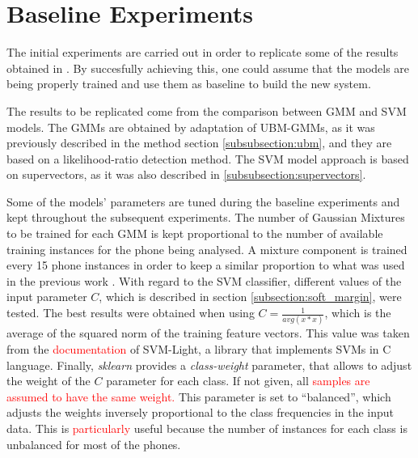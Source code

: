 
\section{Baseline Experiments}

The initial experiments are carried out in order to replicate some of
the results obtained in \cite{main}.
By succesfully achieving this, one could assume that the models are being properly trained
and use them as baseline to build the new system.

The results to be replicated come from the comparison between GMM and SVM models.
The GMMs are obtained by adaptation of UBM-GMMs, as it was previously described in
the method section \ref{subsubsection:ubm}, and they are based on
a likelihood-ratio detection method.
The SVM model approach is based on supervectors, as it was also described
in \ref{subsubsection:supervectors}.

Some of the models' parameters are tuned during the baseline experiments
and kept throughout the subsequent experiments.
The number of Gaussian Mixtures to be trained for each GMM
is kept proportional to the number of
available training instances for the phone being analysed. A
mixture component is trained every 15 phone instances
in order to keep a similar proportion to what was used in the previous work \cite{main}.
With regard to the SVM classifier,
different values of the input parameter $C$, which is described in section
\ref{subsection:soft_margin}, were tested. The best results were obtained when
using $C=\frac{1}{avg(x*x)}$, which is the average of the squared norm of the
training feature vectors. This value was taken from the \textcolor{red}{documentation} of SVM-Light, a library
that implements SVMs in C language. Finally, \textit{sklearn} provides a
\textit{class-weight} parameter, that allows to
adjust the weight of the $C$ parameter for each class.
If not given, all \textcolor{red}{samples are assumed to have the same weight.}
This parameter is set to ``balanced'', which adjusts
the weights inversely proportional to the class frequencies in the input data.
This is \textcolor{red}{particularly} useful because the number of instances
for each class is
unbalanced for most of the phones.

